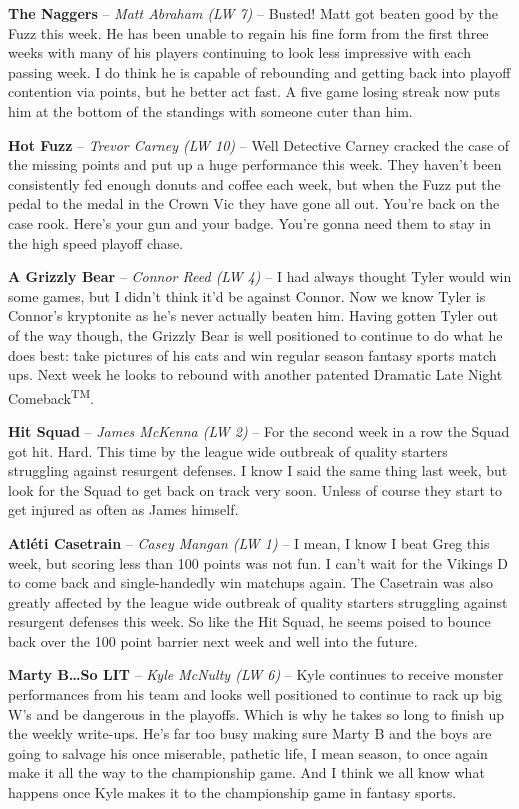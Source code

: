 \documentclass[11pt,letterpaper]{article}
\begin{document}
\begin{etaremune}
\item \textbf{The Naggers} -- \textit{Matt Abraham (LW 7)} -- Busted! Matt got beaten good by the Fuzz this week. He has been unable to regain his fine form from the first three weeks with many of his players continuing to look less impressive with each passing week. I do think he is capable of rebounding and getting back into playoff contention via points, but he better act fast. A five game losing streak now puts him at the bottom of the standings with someone cuter than him. 
\item \textbf{Hot Fuzz} -- \textit{Trevor Carney (LW 10)} --  Well Detective Carney cracked the case of the missing points and put up a huge performance this week. They haven't been consistently fed enough donuts and coffee each week, but when the Fuzz put the pedal to the medal in the Crown Vic they have gone all out. You're back on the case rook. Here's your gun and your badge. You're gonna need them to stay in the high speed playoff chase.
\item \textbf{A Grizzly Bear} -- \textit{Connor Reed (LW 4)} --  I had always thought Tyler would win some games, but I didn't think it'd be against Connor. Now we know Tyler is Connor's kryptonite as he's never actually beaten him. Having gotten Tyler out of the way though, the Grizzly Bear is well positioned to continue to do what he does best: take pictures of his cats and win regular season fantasy sports match ups. Next week he looks to rebound with another patented Dramatic Late Night Comeback\textsuperscript{TM}.
\item \textbf{Hit Squad} -- \textit{James McKenna (LW 2)} -- For the second week in a row the Squad got hit. Hard. This time by the league wide outbreak of quality starters struggling against resurgent defenses. I know I said the same thing last week, but look for the Squad to get back on track very soon. Unless of course they start to get injured as often as James himself. 
\item \textbf{Atl\'{e}ti Casetrain} -- \textit{Casey Mangan (LW 1)} -- I mean, I know I beat Greg this week, but scoring less than 100 points was not fun. I can't wait for the Vikings D to come back and single-handedly win matchups again. The Casetrain was also greatly affected by the league wide outbreak of quality starters struggling against resurgent defenses this week. So like the Hit Squad, he seems poised to bounce back over the 100 point barrier next week and well into the future. 
\item \textbf{Marty B\dots So LIT} -- \textit{Kyle McNulty (LW 6)} -- Kyle continues to receive monster performances from his team and looks well positioned to continue to rack up big W's and be dangerous in the playoffs. Which is why he takes so long to finish up the weekly write-ups. He's far too busy making sure Marty B and the boys are going to salvage his once miserable, pathetic life, I mean season, to once again make it all the way to the championship game. And I think we all know what happens once Kyle makes it to the championship game in fantasy sports. 

\end{etaremune}
\end{document}
